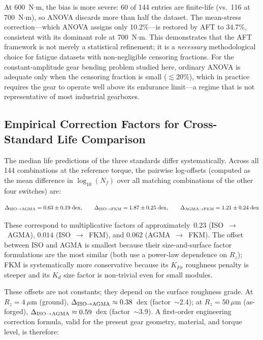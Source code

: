 \documentclass[12pt,a4paper]{article}
\begin{document}
At 600~N$\cdot$m, the bias is more severe: 60 of 144 entries are
finite-life (vs.\ 116 at 700~N$\cdot$m), so ANOVA discards more than
half the dataset. The mean-stress correction---which ANOVA assigns
only 10.2\%---is restored by AFT to 34.7\%, consistent with its
dominant role at 700~N$\cdot$m. This demonstrates that the AFT
framework is not merely a statistical refinement; it is a
\emph{necessary} methodological choice for fatigue datasets with
non-negligible censoring fractions. For the constant-amplitude gear
bending problem studied here, ordinary ANOVA is adequate only when the
censoring fraction is small ($\lesssim 20$\%), which in practice
requires the gear to operate well above its endurance limit---a regime
that is not representative of most industrial gearboxes.

\subsection{Empirical Correction Factors for Cross-Standard Life Comparison}

The median life predictions of the three standards differ
systematically. Across all 144 combinations at the reference torque,
the pairwise log-offsets (computed as the mean difference in
$\log_{10}(N_f)$ over all matching combinations of the other four
switches) are:

\begin{equation}
\Delta_{\rm ISO\to AGMA} = 0.63 \pm 0.19\;\text{dex},\qquad
\Delta_{\rm ISO\to FKM}  = 1.87 \pm 0.25\;\text{dex},\qquad
\Delta_{\rm AGMA\to FKM} = 1.21 \pm 0.24\;\text{dex}
\label{eq:offsets}
\end{equation}

These correspond to multiplicative factors of approximately~$0.23$
(ISO~$\to$~AGMA), $0.014$ (ISO~$\to$~FKM), and $0.062$
(AGMA~$\to$~FKM). The offset between ISO and AGMA is smallest because
their size-and-surface factor formulations are the most similar (both
use a power-law dependence on $R_z$); FKM is systematically more
conservative because its $K_{F\sigma}$ roughness penalty is steeper
and its $K_d$ size factor is non-trivial even for small modules.

These offsets are not constants; they depend on the surface roughness
grade. At $R_z=4~\mu$m (ground), $\Delta_{\rm ISO\to AGMA} \approx
0.38$~dex (factor~$\sim$2.4); at $R_z=50~\mu$m (as-forged),
$\Delta_{\rm ISO\to AGMA} \approx 0.59$~dex (factor~$\sim$3.9). A
first-order engineering correction formula, valid for the present gear
geometry, material, and torque level, is therefore:
\end{document}
